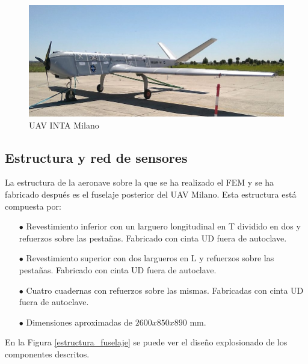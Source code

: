 \begin{figure}[ht]
    \centering
    \includegraphics[width=120mm]{3/Fotos/Milano.png}
    \captionsetup{justification=centering,margin=1.25cm}
    \caption{UAV INTA Milano}
    \label{mialno}
\end{figure}




\subsection{Estructura y red de sensores}

La estructura de la aeronave sobre la que se ha realizado el FEM y se ha fabricado después es el fuselaje posterior del UAV Milano. Esta estructura está compuesta por:

\begin{itemize}
    \item[\tiny$\bullet$] Revestimiento inferior con un larguero longitudinal en T dividido en dos y refuerzos sobre las pestañas. Fabricado con cinta UD fuera de autoclave.
    \item[\tiny$\bullet$] Revestimiento superior con dos largueros en L y refuerzos sobre las pestañas. Fabricado con cinta UD fuera de autoclave.
    \item[\tiny$\bullet$] Cuatro cuadernas con refuerzos sobre las mismas. Fabricadas con cinta UD fuera de autoclave.
    \item[\tiny$\bullet$] Dimensiones aproximadas de $2600 x 850 x 890$ mm.
\end{itemize}

En la Figura \ref{estructura_fuselaje} se puede ver el diseño explosionado de los componentes descritos.

